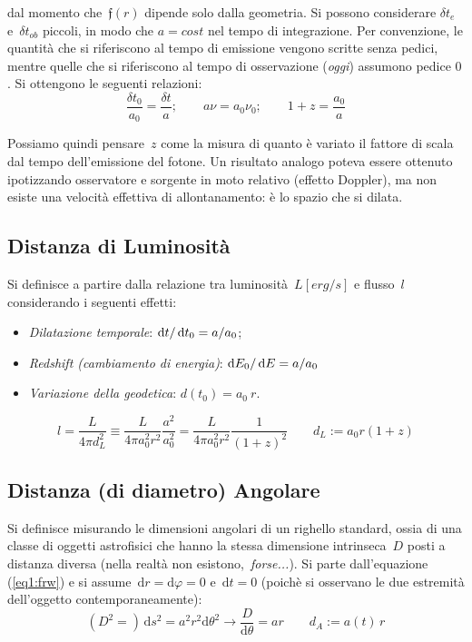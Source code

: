 dal momento che~\(\mathfrak{f}(r)\) dipende solo dalla geometria.
Si possono considerare \(\delta t_{e}\) e~\(\delta t_{ob}\) piccoli, in modo che \(a=cost\) nel tempo di integrazione. Per convenzione, le quantità che si riferiscono al tempo di emissione vengono scritte senza pedici, mentre quelle che si riferiscono al tempo di osservazione (\emph{oggi}) assumono pedice $0$. Si ottengono le seguenti relazioni:
\begin{equation}
\frac{\delta t_0}{a_0}=\frac{\delta t}{a};\qquad a\nu=a_0\nu_0;\qquad 1+z=\frac{a_0}{a}
\end{equation}

Possiamo quindi pensare~\(z\) come la misura di quanto è
variato il fattore di scala dal tempo dell'emissione del fotone. Un
risultato analogo poteva essere ottenuto ipotizzando osservatore e
sorgente in moto relativo (effetto Doppler), ma non esiste una velocità
effettiva di allontanamento: è lo spazio che si dilata.


\subsection{Distanza di Luminosità}

Si definisce a partire dalla relazione tra luminosità~\(L [erg/s]\)
e flusso~\(l\) considerando i seguenti effetti:

\begin{itemize}
\item
  \emph{Dilatazione temporale}: $\operatorname{d}\!{t} / \operatorname{d}\!{t_0} = a / a_0$; 
\item
  \emph{Redshift (cambiamento di energia)}: $\operatorname{d}\!{E}_0 / \operatorname{d}\!{E} = a / a_0$
\item
  \emph{Variazione della geodetica}: $d(t_0) = a_0\: r$.
\end{itemize}
\begin{equation}
l=\frac{L}{4\pi d_L^2}\equiv\frac{L}{4\pi a_0^2r^2}\frac{a^2}{a_0^2}=\frac{L}{4\pi a_0^2r^2}\frac{1}{(1+z)^2}\qquad d_L := a_0 r (1+z)
\end{equation}

\subsection{Distanza (di diametro) Angolare}

Si definisce misurando le dimensioni angolari di un righello standard,
ossia di una classe di oggetti astrofisici che hanno la stessa
dimensione intrinseca~\(D\) posti a distanza diversa (nella
realtà non esistono,~\emph{forse...}). Si parte dall'equazione (\ref{eq1:frw}) e si
assume~\(\mathrm{d}r=\mathrm{d}\varphi = 0\) e~\(\mathrm{d}t=0\) (poichè si osservano le
due estremità dell'oggetto contemporaneamente):
\begin{equation}
(D^2=)\, \mathrm{d}s^2=a^2r^2\mathrm{d}\theta^2\rightarrow \frac{D}{\mathrm{d}\theta}=ar\qquad d_A:=a(t)\, r
\end{equation}

